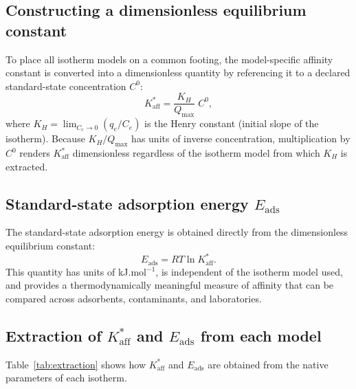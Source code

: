 \documentclass[journal=jacsat,manuscript=article]{achemso}
\begin{document}
	\subsection{Constructing a dimensionless equilibrium constant}
	\label{sec:dimensionless_K}

	To place all isotherm models on a common footing, the model-specific affinity constant is converted into a dimensionless quantity by referencing it to a declared standard-state concentration $C^{0}$:
	\begin{equation}
		K_{\mathrm{aff}}^{\ast}
		= \frac{K_H}{Q_{\max}}\; C^{0},
		\label{eq:Kaff_star}
	\end{equation}
	where $K_H = \lim_{C_e \to 0} (q_e / C_e)$ is the Henry constant (initial slope of the isotherm). Because $K_H / Q_{\max}$ has units of inverse concentration, multiplication by $C^{0}$ renders $K_{\mathrm{aff}}^{\ast}$ dimensionless regardless of the isotherm model from which $K_H$ is extracted.

	\subsection{Standard-state adsorption energy $E_{\mathrm{ads}}$}
	\label{sec:Eads}

	The standard-state adsorption energy is obtained directly from the dimensionless equilibrium constant:
	\begin{equation}
		E_{\mathrm{ads}} = RT \ln K_{\mathrm{aff}}^{\ast}.
		\label{eq:Eads}
	\end{equation}
	This quantity has units of kJ.mol$^{-1}$, is independent of the isotherm model used, and provides a thermodynamically meaningful measure of affinity that can be compared across adsorbents, contaminants, and laboratories.

	\subsection{Extraction of $K_{\mathrm{aff}}^{\ast}$ and $E_{\mathrm{ads}}$ from each model}
	\label{sec:extraction}

	Table~\ref{tab:extraction} shows how $K_{\mathrm{aff}}^{\ast}$ and $E_{\mathrm{ads}}$ are obtained from the native parameters of each isotherm.
\end{document}
